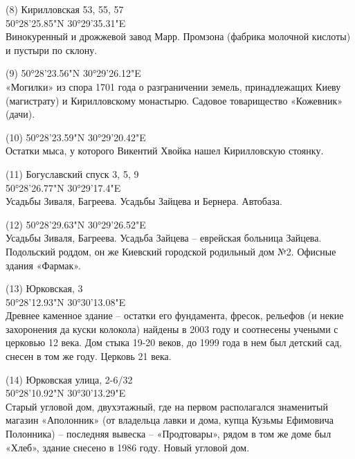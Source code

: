\begin{flushleft}
\medskip

(8) Кирилловская 53, 55, 57\\
50°28'25.85"N 30°29'35.31"E\\
Винокуренный и дрожжевой завод Марр. Промзона (фабрика молочной кислоты) и пустыри по склону.\\

\medskip

(9) 50°28'23.56"N 30°29'26.12"E\\
«Могилки» из спора 1701 года о разграничении земель, принадлежащих Киеву (магистрату) и Кирилловскому монастырю. Садовое товарищество «Кожевник» (дачи).\\

\medskip


(10) 50°28'23.59"N 30°29'20.42"E\\
Остатки мыса, у которого Викентий Хвойка нашел Кирилловскую стоянку.\\

\medskip


(11) Богуславский спуск 3, 5, 9\\
50°28'26.77"N 30°29'17.4"E\\
Усадьбы Зиваля, Багреева. Усадьбы Зайцева и Бернера. Автобаза.\\

\medskip


(12) 50°28'29.63"N 30°29'26.52"E\\
Усадьбы Зиваля, Багреева. Усадьба Зайцева – еврейская больница Зайцева. Подольский роддом, он же Киевский городской родильный дом №2. Офисные здания «Фармак».\\

\medskip


(13) Юрковская, 3\\
50°28'12.93"N 30°30'13.08"E\\
Древнее каменное здание – остатки его фундамента, фресок, рельефов (и некие захоронения да куски колокола) найдены в 2003 году и соотнесены учеными с церковью 12 века. Дом стыка 19-20 веков, до 1999 года в нем был детский сад, снесен в том же году. Церковь 21 века.\\

\medskip


(14) Юрковская улица, 2-6/32\\
50°28'10.92"N 30°30'13.29"E\\
Старый угловой дом, двухэтажный, где на первом располагался знаменитый магазин «Аполонник» (от владельца лавки и дома, купца Кузьмы Ефимовича Полонника) – последняя вывеска – «Продтовары», рядом в том же доме был «Хлеб», здание снесено в 1986 году. Новый угловой дом.\\


\end{flushleft}
